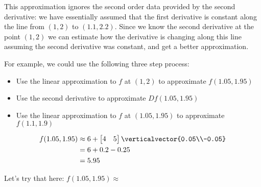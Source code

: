 \documentclass{ximera}
\begin{document}
\begin{question}
  This approximation ignores the second order data provided by the second derivative: we have essentially 
  assumed that the first derivative is constant along the line from $(1,2)$ to $(1.1,2.2)$.  Since we know the second 
  derivative at the point $(1,2)$ we can estimate how the derivative is changing along this line assuming the second 
  derivative was constant, and get a better approximation.
  
  For example, we could use the following three step process:
  
  \begin{itemize}
  \item Use the linear approximation to $f$ at $(1,2)$ to approximate $f(1.05,1.95)$
  \item Use the second derivative to approximate $Df(1.05,1.95)$
  \item Use the linear approximation to $f$ at $(1.05,1.95)$ to approximate $f(1.1,1.9)$
  \end{itemize}
  
  \begin{solution}
    \begin{hint}
      \begin{align*}
        f(1.05,1.95) &\approx 6+\begin{bmatrix} 4 & 5 \end{bmatrix} \verticalvector{0.05\\-0.05}\\
        &=6+0.2-0.25\\
        &=5.95
      \end{align*}
    \end{hint}
    Let's try that here:  $f(1.05,1.95) \approx$ 
  \end{solution}


\end{question}
\end{document}
